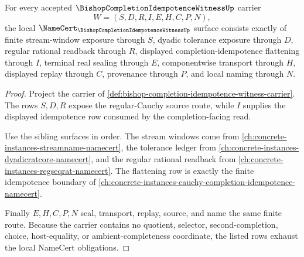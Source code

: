 \begin{theorem}
\label{thm:bishop-completion-idempotence-witness-obligations}
For every accepted $\BishopCompletionIdempotenceWitnessUp$ carrier
$$
W=(S,D,R,I,E,H,C,P,N),
$$
the local $\NameCert_{\BishopCompletionIdempotenceWitnessUp}$ surface consists exactly of finite stream-window exposure through $S$, dyadic tolerance exposure through $D$, regular rational readback through $R$, displayed completion-idempotence flattening through $I$, terminal real sealing through $E$, componentwise transport through $H$, displayed replay through $C$, provenance through $P$, and local naming through $N$.
\end{theorem}
\begin{proof}
Project the carrier of \autoref{def:bishop-completion-idempotence-witness-carrier}. The rows $S,D,R$ expose the regular-Cauchy source route, while $I$ supplies the displayed idempotence row consumed by the completion-facing read.

Use the sibling surfaces in order. The stream windows come from \autoref{ch:concrete-instances-streamname-namecert}, the tolerance ledger from \autoref{ch:concrete-instances-dyadicratcore-namecert}, and the regular rational readback from \autoref{ch:concrete-instances-regseqrat-namecert}. The flattening row is exactly the finite idempotence boundary of \autoref{ch:concrete-instances-cauchy-completion-idempotence-namecert}.

Finally $E,H,C,P,N$ seal, transport, replay, source, and name the same finite route. Because the carrier contains no quotient, selector, second-completion, choice, host-equality, or ambient-completeness coordinate, the listed rows exhaust the local NameCert obligations.
\end{proof}

